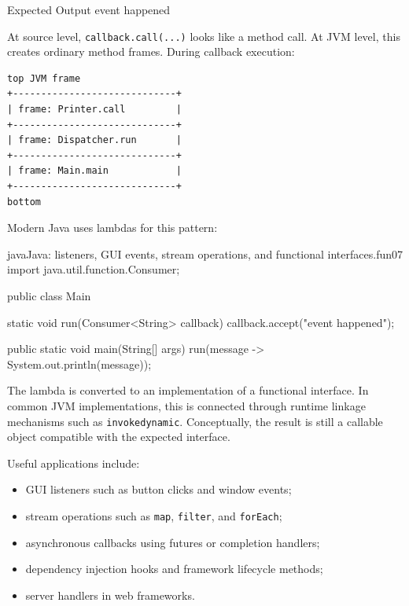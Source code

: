 \begin{iobox}{Expected Output}
event happened \\
\end{iobox}



At source level, \texttt{callback.call(...)} looks like a method call. At JVM level, this creates ordinary method frames. During callback execution:

\begin{verbatim}
top JVM frame
+-----------------------------+
| frame: Printer.call         |
+-----------------------------+
| frame: Dispatcher.run       |
+-----------------------------+
| frame: Main.main            |
+-----------------------------+
bottom
\end{verbatim}

Modern Java uses lambdas for this pattern:

\begin{codebox}[]{java}{Java: listeners, GUI events, stream operations, and functional interfaces.}{fun07}
import java.util.function.Consumer;

public class Main {
    static void run(Consumer<String> callback) {
        callback.accept("event happened");
    }

    public static void main(String[] args) {
        run(message -> System.out.println(message));
    }
}
\end{codebox}


The lambda is converted to an implementation of a functional interface. In common JVM implementations, this is connected through runtime linkage mechanisms such as \texttt{invokedynamic}. Conceptually, the result is still a callable object compatible with the expected interface.

Useful applications include:

\begin{itemize}
    \item GUI listeners such as button clicks and window events;
    \item stream operations such as \texttt{map}, \texttt{filter}, and \texttt{forEach};
    \item asynchronous callbacks using futures or completion handlers;
    \item dependency injection hooks and framework lifecycle methods;
    \item server handlers in web frameworks.
\end{itemize}

